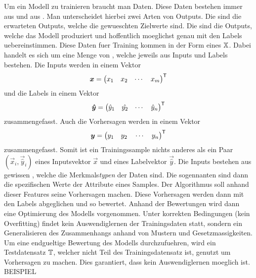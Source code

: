 Um ein Modell zu trainieren braucht man Daten. Diese Daten bestehen immer aus
 und aus . Man unterscheidet hierbei zwei Arten
von Outputs. Die  sind die erwarteten Outputs, welche die
gewueschten Zielwerte sind. Die  sind die Outputs, welche
das Modell produziert und hoffentlich moeglichst genau mit den Labels
uebereinstimmen.
\para{}
Diese Daten fuer Training kommen in der Form eines  $\mathbb{X}$.
Dabei handelt es sich um eine Menge von ,
welche jeweils aus Inputs und Labels bestehen.
Die Inputs werden in einem Vektor
\[ \bm{x} = \begin{pmatrix} x_1 & x_2 & \cdots & x_m \end{pmatrix}^{\mathsf{T}} \]
und die Labels in einem Vektor
\[ \bm{\hat{y}} = \begin{pmatrix} \hat{y}_1 & \hat{y_2} & \cdots & \hat{y}_n \end{pmatrix}^{\mathsf{T}} \]
zusammengefasst. Auch die Vorhersagen werden in einem Vektor
\[\bm{y} = \begin{pmatrix} y_1 \quad y_2 \quad \cdots \quad y_n \end{pmatrix}^{\mathsf{T}} \]
zusammengefasst.
Somit ist ein Trainingssample nichts anderes als ein Paar
$(\vec{x}_i,\vec{\hat{y}}_i)$ eines Inputsvektor $\vec{x}$ und eines Labelvektor
$\vec{\hat{y}}$.
\para{}
Die Inputs bestehen aus gewissen , welche die
Merkmals\textit{typen} der Daten sind. Die sogennanten  sind
dann die spezifischen Werte der Attribute eines Samples. Der Algorithmus soll
anhand dieser Features seine Vorhersagen machen.
Diese Vorhersagen werden dann mit den Labels abgeglichen und so bewertet.
Anhand der Bewertungen wird dann eine Optimierung des Modells vorgenommen.
Unter korrekten Bedingungen (kein Overfitting) findet kein Auswendiglernen der Trainingsdaten statt,
sondern ein Generalisieren des Zusammenhangs anhand von Mustern und Gesetzmassigkeiten.
\para{}
Um eine endgueltige Bewertung des Modells durchzufuehren, wird ein Testdatensatz
$\mathbb{T}$, welcher nicht Teil des Trainingsdatensatz ist, genutzt um Vorhersagen zu machen.
Dies garantiert, dass kein Auswendiglernen moeglich ist.
\para{}
BEISPIEL


